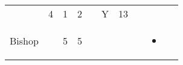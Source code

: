 \documentclass[12pt]{article}
\begin{document}
\begin{longtable}[]{@{}llllllllll@{}}
\begin{minipage}[t]{0.06\columnwidth}
\strut\end{minipage} &
\begin{minipage}[t]{0.06\columnwidth}\raggedright\strut
4
\strut\end{minipage} &
\begin{minipage}[t]{0.06\columnwidth}\raggedright\strut
1
\strut\end{minipage} &
\begin{minipage}[t]{0.06\columnwidth}\raggedright\strut
2
\strut\end{minipage} &
\begin{minipage}[t]{0.06\columnwidth}\raggedright\strut
\strut\end{minipage} &
\begin{minipage}[t]{0.07\columnwidth}\raggedright\strut
Y
\strut\end{minipage} &
\begin{minipage}[t]{0.08\columnwidth}\raggedright\strut
13
\strut\end{minipage}\tabularnewline
\begin{minipage}[t]{0.13\columnwidth}\raggedright\strut
Bishop
\strut\end{minipage} &
\begin{minipage}[t]{0.06\columnwidth}\raggedright\strut
\strut\end{minipage} &
\begin{minipage}[t]{0.06\columnwidth}\raggedright\strut
5
\strut\end{minipage} &
\begin{minipage}[t]{0.06\columnwidth}\raggedright\strut
5
\strut\end{minipage} &
\begin{minipage}[t]{0.06\columnwidth}\raggedright\strut
\strut\end{minipage} &
\begin{minipage}[t]{0.06\columnwidth}\raggedright\strut
\strut\end{minipage} &
\begin{minipage}[t]{0.06\columnwidth}\raggedright\strut
\strut\end{minipage} &
\begin{minipage}[t]{0.06\columnwidth}\raggedright\strut
\strut\end{minipage} &
\begin{minipage}[t]{0.07\columnwidth}\raggedright\strut
\begin{itemize}
\item
\end{itemize}
\strut\end{minipage} &

\end{longtable}
\end{document}
